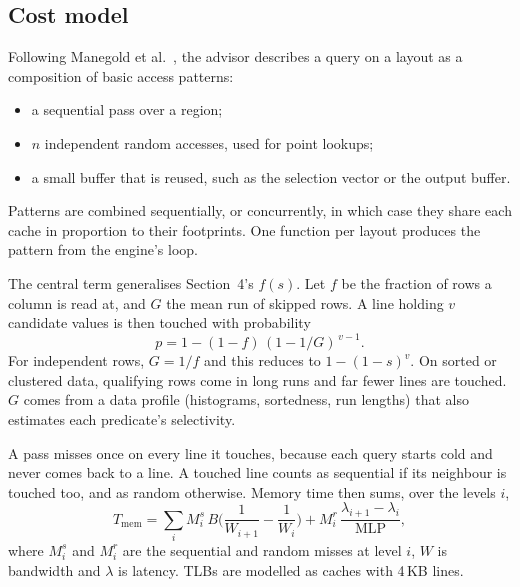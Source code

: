 \subsection{Cost model}
Following Manegold et al.~\cite{manegold}, the advisor describes a query on a layout as a
composition of basic access patterns:
\begin{itemize}
  \item a sequential pass over a region;
  \item $n$ independent random accesses, used for point lookups;
  \item a small buffer that is reused, such as the selection vector or the output buffer.
\end{itemize}
Patterns are combined sequentially, or concurrently, in which case they share each cache in
proportion to their footprints. One function per layout produces the pattern from the
engine's loop.

The central term generalises Section~4's $f(s)$. Let $f$ be the fraction of rows a column is
read at, and $G$ the mean run of skipped rows. A line holding $v$ candidate values is then
touched with probability
\[ p = 1-(1-f)\,(1-1/G)^{\,v-1}. \]
For independent rows, $G = 1/f$ and this reduces to $1-(1-s)^v$. On sorted or clustered data,
qualifying rows come in long runs and far fewer lines are touched. $G$ comes from a data
profile (histograms, sortedness, run lengths) that also estimates each predicate's selectivity.

A pass misses once on every line it touches, because each query starts cold and never comes
back to a line. A touched line counts as sequential if its neighbour is touched too, and as
random otherwise. Memory time then sums, over the levels $i$,
\[ T_\mathrm{mem}=\sum_i M^s_i\,B\Big(\frac{1}{W_{i+1}}-\frac{1}{W_i}\Big)
 + M^r_i\,\frac{\lambda_{i+1}-\lambda_i}{\mathrm{MLP}}, \]
where $M^s_i$ and $M^r_i$ are the sequential and random misses at level $i$, $W$ is bandwidth
and $\lambda$ is latency. TLBs are modelled as caches with 4\,KB lines.

